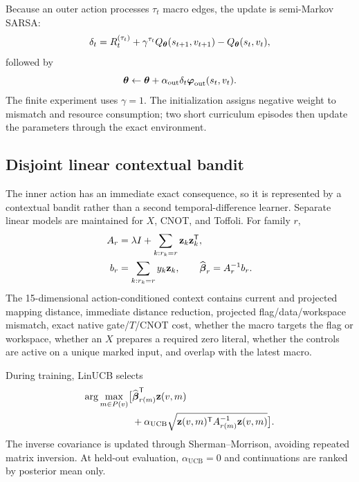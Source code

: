 Because an outer action processes $\tau_t$ macro edges, the update is semi-Markov SARSA:
\begin{equation}
\delta_t=R_t^{(\tau_t)}
+\gamma^{\tau_t}Q_{\boldsymbol{\theta}}(s_{t+1},v_{t+1})
-Q_{\boldsymbol{\theta}}(s_t,v_t),
\label{eq:smdp-sarsa}
\end{equation}
followed by
\begin{equation}
\boldsymbol{\theta}\leftarrow\boldsymbol{\theta}+
\alpha_{\mathrm{out}}\delta_t\boldsymbol{\varphi}_{\mathrm{out}}(s_t,v_t).
\label{eq:outer-update}
\end{equation}
The finite experiment uses $\gamma=1$.  The initialization assigns negative weight to mismatch and resource consumption; two short curriculum episodes then update the parameters through the exact environment.

\subsection{Disjoint linear contextual bandit}

The inner action has an immediate exact consequence, so it is represented by a contextual bandit rather than a second temporal-difference learner.  Separate linear models are maintained for $X$, CNOT, and Toffoli.  For family $r$,
\begin{equation}
\begin{aligned}
A_r&=\lambda I+\sum_{k:r_k=r}\mathbf{z}_k\mathbf{z}_k^\mathsf T,\\
b_r&=\sum_{k:r_k=r}y_k\mathbf{z}_k,\qquad
\widehat{\boldsymbol{\beta}}_r=A_r^{-1}b_r.
\end{aligned}
\label{eq:linucb-estimator}
\end{equation}
The 15-dimensional action-conditioned context contains current and projected mapping distance, immediate distance reduction, projected flag/data/workspace mismatch, exact native gate/$T$/CNOT cost, whether the macro targets the flag or workspace, whether an $X$ prepares a required zero literal, whether the controls are active on a unique marked input, and overlap with the latest macro.

During training, LinUCB selects
\begin{equation}
\begin{aligned}
\arg\max_{m\in P(v)}\bigl[&
\widehat{\boldsymbol{\beta}}_{r(m)}^\mathsf T\mathbf{z}(v,m)\\
&+\alpha_{\mathrm{UCB}}
\sqrt{\mathbf{z}(v,m)^\mathsf T A_{r(m)}^{-1}\mathbf{z}(v,m)}\bigr].
\end{aligned}
\label{eq:linucb-score}
\end{equation}
The inverse covariance is updated through Sherman--Morrison, avoiding repeated matrix inversion.  At held-out evaluation, $\alpha_{\mathrm{UCB}}=0$ and continuations are ranked by posterior mean only.

